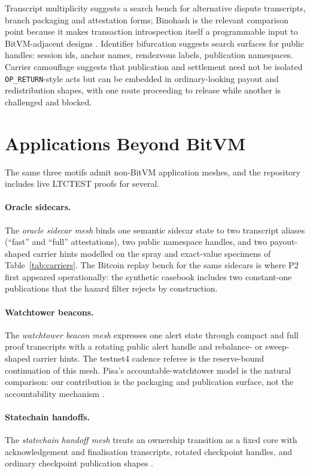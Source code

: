 \documentclass[11pt]{article}
\begin{document}
Transcript multiplicity suggests a search bench for alternative dispute
transcripts, branch packaging and attestation forms; Binohash is the relevant
comparison point because it makes transaction introspection itself a
programmable input to BitVM-adjacent designs \cite{linus2026binohash}.
Identifier bifurcation suggests search surfaces for public handles: session
ids, anchor names, rendezvous labels, publication namespaces. Carrier
camouflage suggests that publication and settlement need not be isolated
\texttt{OP\_RETURN}-style acts but can be embedded in ordinary-looking payout
and redistribution shapes, with one route proceeding to release while another is
challenged and blocked.

\section{Applications Beyond BitVM}
\label{sec:beyond}

The same three motifs admit non-BitVM application meshes, and the repository
includes live LTCTEST proofs for several.

\paragraph{Oracle sidecars.} The \emph{oracle sidecar mesh} binds one semantic
sidecar state to two transcript aliases (``fast'' and ``full'' attestations),
two public namespace handles, and two payout-shaped carrier hints modelled on
the spray and exact-value specimens of Table~\ref{tab:carriers}. The Bitcoin
replay bench for the same sidecars is where P2 first appeared operationally: the
synthetic casebook includes two constant-one publications that the hazard
filter rejects by construction.

\paragraph{Watchtower beacons.} The \emph{watchtower beacon mesh} expresses one
alert state through compact and full proof transcripts with a rotating public
alert handle and rebalance- or sweep-shaped carrier hints. The testnet4 cadence
referee is the reserve-bound continuation of this mesh. Pisa's
accountable-watchtower model is the natural comparison: our contribution is the
packaging and publication surface, not the accountability mechanism
\cite{mccorry2019pisa}.

\paragraph{Statechain handoffs.} The \emph{statechain handoff mesh} treats an
ownership transition as a fixed core with acknowledgement and finalisation
transcripts, rotated checkpoint handles, and ordinary checkpoint publication
shapes \cite{somsen2018statechains}.
\end{document}
